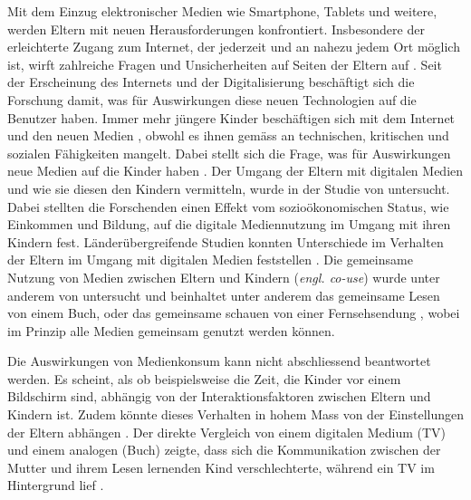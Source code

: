 Mit dem Einzug elektronischer Medien wie Smartphone, Tablets und weitere, werden Eltern mit neuen Herausforderungen konfrontiert. Insbesondere der erleichterte Zugang zum Internet, der jederzeit und an nahezu jedem Ort möglich ist, wirft zahlreiche Fragen und Unsicherheiten auf Seiten der Eltern auf \cite{Wagner2016}. Seit der Erscheinung des Internets und der Digitalisierung beschäftigt sich die Forschung damit, was für Auswirkungen diese neuen Technologien auf die Benutzer haben. Immer mehr jüngere Kinder beschäftigen sich mit dem Internet und den neuen Medien \cite{Rideout2013a, Chaudron2015}, obwohl es ihnen gemäss  an technischen, kritischen und sozialen Fähigkeiten mangelt. Dabei stellt sich die Frage, was für Auswirkungen neue Medien auf die Kinder haben \cite{Tomopoulos2010, Pempek2014, Livingstone2015, Masur2015, Troseth2016}. Der Umgang der Eltern mit digitalen Medien und wie sie diesen den Kindern vermitteln, wurde in der Studie von  untersucht. Dabei stellten die Forschenden einen Effekt vom sozioökonomischen Status, wie Einkommen und Bildung, auf die digitale Mediennutzung im Umgang mit ihren Kindern fest. Länderübergreifende Studien konnten Unterschiede im Verhalten der Eltern im Umgang mit digitalen Medien feststellen \cite{Helsper2013}. Die gemeinsame Nutzung von Medien zwischen Eltern und Kindern (\textit{engl. co-use}) wurde unter anderem von  untersucht und beinhaltet unter anderem das gemeinsame Lesen von einem Buch, oder das gemeinsame schauen von einer Fernsehsendung \cite{Connel2015}, wobei im Prinzip alle Medien gemeinsam genutzt werden können. 

Die Auswirkungen von Medienkonsum kann nicht abschliessend beantwortet werden. Es scheint, als ob beispielsweise die Zeit, die Kinder vor einem Bildschirm sind, abhängig von der Interaktionsfaktoren zwischen Eltern und Kindern ist. Zudem könnte dieses Verhalten in hohem Mass von der Einstellungen der Eltern abhängen \cite{Lauricella2015}. Der direkte Vergleich von einem digitalen Medium (TV) und einem analogen (Buch) zeigte, dass sich die Kommunikation zwischen der Mutter und ihrem Lesen lernenden Kind verschlechterte, während ein TV im Hintergrund lief \cite{Nathanson2011}.

